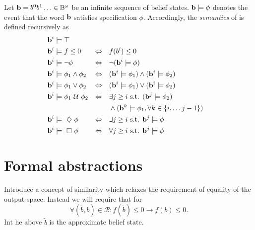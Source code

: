\documentclass[conference]{IEEEtran}
\newcommand{\rel}{\mathcal{R}}%
\begin{document}
    \begin{definition}
    \label{def:gdtl-semantics}
    Let $\mathbf{b} = b^0b^1 \ldots \in \mathbb{B}^{\omega}$
    be an infinite sequence of belief states. $\mathbf{b} \models \phi$ denotes the event that the word $\mathbf{b}$ satisfies specification $\phi$. Accordingly, the {\em semantics} of \DTL is defined recursively as
    \begin{align*}
    &\BF{b}^i \models  \top  & \\
    &\BF{b}^i \models f \leq 0 & \Equiv\quad & f(b^i) \leq 0\\ %
    &\BF{b}^i \models \notltl \phi & \Equiv\quad & \notltl (\BF{b}^i \models \phi) \\
    &\BF{b}^i \models \phi_1 \andltl  \phi_2  & \Equiv\quad & ( \BF{b}^i \models \phi_1 ) \andltl ( \BF{b}^i \models \phi_2 ) \\
    &\BF{b}^i \models \phi_1 \orltl  \phi_2  & \Equiv\quad & ( \BF{b}^i \models \phi_1 ) \orltl ( \BF{b}^i \models \phi_2 ) \\
    &\BF{b}^i \models  \phi_1 \Until \phi_2 & \Equiv\quad & \exists j \geq i \text{ s.t. } ( \BF{b}^j \models \phi_2 ) \\
    & & & \andltl (\BF{b}^k \models \phi_1, \forall k \in \{i, \ldots j-1\})\\
    &\BF{b}^i \models \Event \phi  & \Equiv\quad & \exists j \geq i \text{ s.t. } \BF{b}^j \models \phi \\
    &\BF{b}^i \models \Always \phi  & \Equiv\quad & \forall j \geq i \text{ s.t. } \BF{b}^j \models \phi
    \end{align*}
    
    \end{definition}



\section{Formal abstractions}

 Introduce a concept of similarity which relaxes the requirement of equality of the output space. 
 Instead we will require that for 
 \[\forall (\tilde b,b)\in \rel: f(\tilde b)\leq 0\rightarrow f( b)\leq 0.\]
Int he above  $\tilde b$ is the approximate belief state. 

	
	
\end{document}
